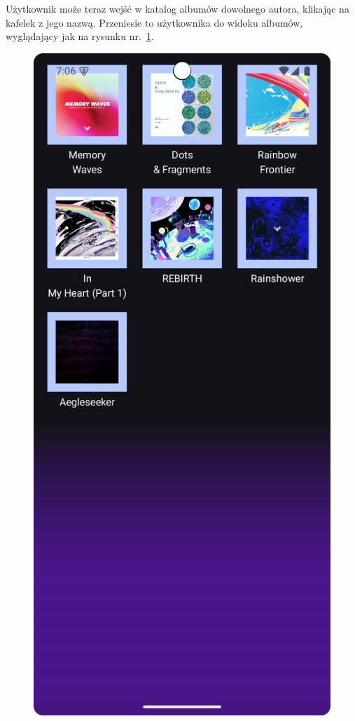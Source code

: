 Użytkownik może teraz wejść w katalog albumów dowolnego autora, klikając na kafelek z jego nazwą. Przeniesie to użytkownika do widoku albumów, wyglądający jak na rysunku nr.~\ref{fig:tutorial_album_view}.

\begin{figure}[H]
	\centering
	\includegraphics[width=1\textwidth]{images/tutorial_album_view.png}
	\caption{}
	\label{fig:tutorial_album_view}
\end{figure}

